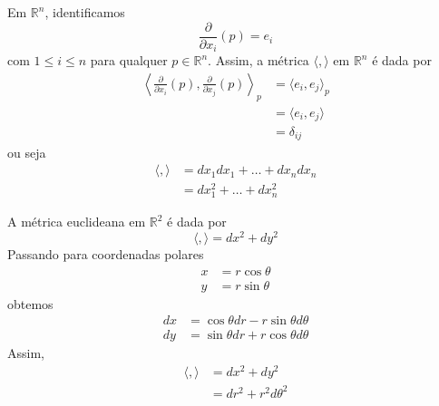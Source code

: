 \begin{exemplo}
	Em $\mathbb{R}^n$, identificamos
	\begin{equation*}
		\frac{\partial}{\partial x_i} (p) = e_i
	\end{equation*}	
	com $1 \leq i \leq n$ para qualquer $p \in \mathbb{R}^n$. Assim, a métrica $\langle , \rangle$ em $\mathbb{R}^n$ é dada por
	\begin{align*}
		\left\langle \frac{\partial}{\partial x_i}(p), \frac{\partial}{\partial x_j}(p) \right\rangle_p &= \langle e_i, e_j \rangle_p\\
		&= \langle e_i, e_j \rangle\\
		&= \delta_{ij}
	\end{align*}	
	ou seja
	\begin{align*}
		\langle , \rangle &= dx_1 dx_1 + \ldots + dx_n dx_n \\
		&= dx_1^2 + \ldots + dx_n^2
	\end{align*}
\end{exemplo}


\begin{exemplo}
	A métrica euclideana em $\mathbb{R}^2$ é dada por
	\begin{equation*}
		\langle , \rangle = dx^2 + dy^2
	\end{equation*}	
	Passando para coordenadas polares
	\begin{align*}
		x &= r \cos \theta\\
		y &= r \sin \theta
	\end{align*}	
	obtemos
	\begin{align*}
		dx &= \cos \theta dr - r \sin \theta d\theta\\
		dy &= \sin \theta dr + r \cos \theta d\theta
	\end{align*}	
	Assim,
	\begin{align*}
		\langle , \rangle &= dx^2 + dy^2\\
		&= dr^2 + r^2 d\theta^2
	\end{align*}
\end{exemplo}

